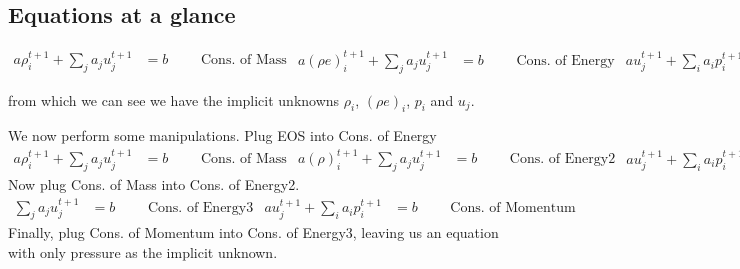 \documentclass[11pt,letterpaper,notitlepage]{article}
\numberwithin{equation}{section}
\begin{document}
\subsection{Equations at a glance}
\begin{subequations}
\begin{align}
	a\rho_i^{t+1} + \sum_j a_j u_j^{t+1} &= b 
	\quad \quad \text{ Cons. of Mass}
\end{align}
\begin{align}
	a (\rho e)_i^{t+1} + \sum_j a_j u_j^{t+1} &= b 
	\quad \quad \text{ Cons. of Energy}
\end{align}
\begin{align}
	a u_j^{t+1} + \sum_i a_i p_i^{t+1} &= b 
	\quad \quad \text{ Cons. of Momentum}
\end{align}
\begin{align}
	(\rho e)_i^{t+1} + a_i \rho_i^{t+1} &= b
	\quad \quad \text{ EOS}
\end{align}
\end{subequations}

from which we can see we have the implicit unknowns $\rho_i$, $(\rho e)_i$, $p_i$ and $u_j$.

We now perform some manipulations. Plug EOS into Cons. of Energy
\begin{subequations}
	\begin{align}
		a\rho_i^{t+1} + \sum_j a_j u_j^{t+1} &= b 
		\quad \quad \text{ Cons. of Mass}
	\end{align}
	\begin{align}
		a (\rho )_i^{t+1} + \sum_j a_j u_j^{t+1} &= b 
		\quad \quad \text{ Cons. of Energy2}
	\end{align}
	\begin{align}
		a u_j^{t+1} + \sum_i a_i p_i^{t+1} &= b 
		\quad \quad \text{ Cons. of Momentum}
	\end{align}
\end{subequations}
Now plug Cons. of Mass into Cons. of Energy2.
\begin{subequations}
	\begin{align}
        \sum_j a_j u_j^{t+1} &= b 
		\quad \quad \text{ Cons. of Energy3}
	\end{align}
	\begin{align}
		a u_j^{t+1} + \sum_i a_i p_i^{t+1} &= b 
		\quad \quad \text{ Cons. of Momentum}
	\end{align}
\end{subequations}
Finally, plug Cons. of Momentum into Cons. of Energy3, leaving us an equation with only pressure as the implicit unknown.
\end{document}
